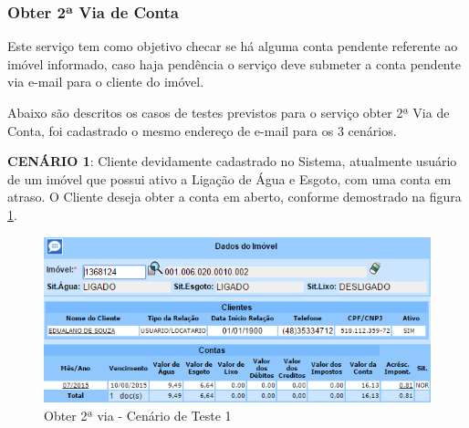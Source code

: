 \subsubsection{Obter 2ª Via de Conta}
Este serviço tem como objetivo checar se há alguma conta pendente referente ao imóvel informado, caso haja pendência o serviço deve submeter a conta pendente via e-mail para o cliente do imóvel. 

Abaixo são descritos os casos de testes previstos para o serviço obter 2ª Via de Conta, foi cadastrado o mesmo endereço de e-mail para os 3 cenários.
\begin{flushleft}
	\begin{description}
		\item \textbf{CENÁRIO 1}: Cliente devidamente cadastrado no Sistema, atualmente usuário de um imóvel que possui ativo a Ligação de Água e Esgoto, com uma conta em atraso. O Cliente deseja obter a conta em aberto, conforme demostrado na figura \ref{figura:2ViaCenario1}.
		\begin{figure}[H]
			\centering
			\caption{Obter 2ª via - Cenário de Teste 1}
			\label{figura:2ViaCenario1}
			\includegraphics{figuras/cenarios/segunda_via/cenario_1.PNG}
		\end{figure}
	\end{description}
	

\end{flushleft}
